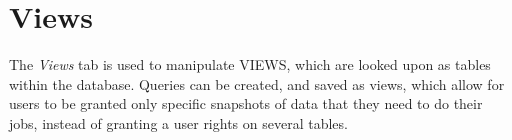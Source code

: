 \section{Views}
The \emph{Views} tab is used to manipulate VIEWS, which are looked upon as
tables within the database. Queries can be created, and saved as views, which 
allow for users to be granted only specific snapshots of data that they need 
to do their jobs, instead of granting a user rights on several tables.
